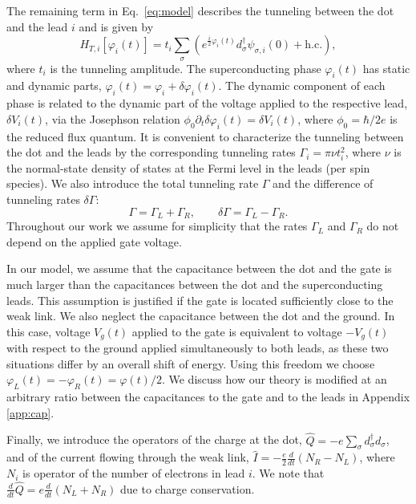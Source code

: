 \documentclass[aps,reprint,longbibliography, prb]{revtex4-2}
\begin{document}
The remaining term in Eq.~\eqref{eq:model} describes the tunneling between the dot and the lead $i$ and is given by
\begin{equation}
\label{eq:tunneling}
H_{T,i}[\varphi_{i}(t)]=t_{i}\sum_\sigma (e^{\frac{i}{2}\varphi_{i}(t)}d^{\dagger}_{\sigma}\psi_{\sigma,i}(0)+\mathrm{h.c.}),
\end{equation}
where $t_i$ is the tunneling amplitude. The superconducting phase $\varphi_i(t)$ has static and dynamic parts, $\varphi_i(t) = \varphi_i + \delta\varphi_i(t)$. The dynamic component of each phase is related to the dynamic part of the voltage applied to the respective lead, $\delta V_i(t)$, via the Josephson relation $\phi_0\partial_t\delta\varphi_i(t)=\delta V_i(t)$, where $\phi_0 = \hbar/2e$ is the reduced flux quantum. It is convenient to characterize the tunneling between the dot and the leads by the corresponding tunneling rates $\Gamma_i = \pi \nu t_i^2$, where $\nu$ is the normal-state density of states at the Fermi level in the leads (per spin species). We also introduce the total tunneling rate $\Gamma$ and the difference of tunneling rates $\delta\Gamma$:
\begin{equation}
\Gamma = \Gamma_L + \Gamma_R,\quad\quad \delta \Gamma = \Gamma_L - \Gamma_R.
\end{equation}
Throughout our work we assume for simplicity that the rates $\Gamma_L$ and $\Gamma_R$ do not depend on the applied gate voltage.

In our model, we assume that the capacitance between the dot and the gate is much larger than the capacitances between the dot and the superconducting leads. This assumption is justified if the gate is located sufficiently close to the weak link. We also neglect the capacitance between the dot and the ground. In this case, voltage $V_g(t)$ applied to the gate is equivalent to voltage $-V_g(t)$ with respect to the ground applied simultaneously to both leads, as these two situations differ by an overall shift of energy. Using this freedom we choose $\varphi_L(t)=-\varphi_R(t)=\varphi(t)/2$. We discuss how our theory is modified at an arbitrary ratio between the capacitances to the gate and to the leads in Appendix \ref{app:cap}.

Finally, we introduce the operators of the charge at the dot, $\hat{Q} = -e\sum_\sigma d^\dagger_\sigma d_\sigma$, and of the current flowing through the weak link, $\hat{I}= -\frac{e}{2}\frac{d}{dt} (N_R-N_L)$, where $N_i$ is operator of the number of electrons in lead $i$. We note that $\frac{d}{dt}\hat{Q} = e\frac{d}{dt}(N_L+N_R)$ due to charge conservation.
\end{document}
